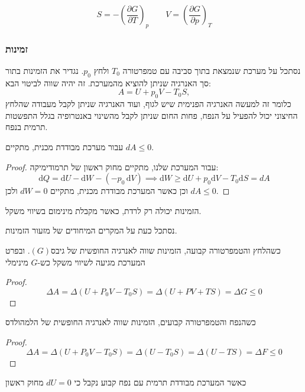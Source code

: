 \documentclass{tstextbook}
\begin{document}
\begin{corollary}
$$S=-\left(\frac{\partial G}{\partial T}\right)_{p}\qquad V=\left(\frac{\partial G}{\partial p}\right)_{T}$$

\end{corollary}
\subsubsection{זמינות}

\begin{definition}[זמינות]
נסתכל על מערכת שנמצאת בתוך סביבה עם טמפרטורה \(T_{0}\) ולחץ \(p_{0}\). נגדיר את הזמינות בתור סך האנרגיה שניתן להוציא מהמערכת. זה יהיה שווה לביטוי הבא:
$$
A=U+p_{0}V-T_{0}S,$$
כלומר זה למעשה האנרגיה הפנימית שיש לגוף, ועוד האנרגיה שניתן לקבל מעבודה שהלחץ החיצוני יכול להפעיל על הנפח, פחות החום שניתן לקבל מהשינוי באנטרופיה בגלל התפשטות תרמית בנפח.

\end{definition}
\begin{proposition}
עבור מערכת מבודדת מכנית, מתקיים \(dA\leq 0\). 

\end{proposition}
\begin{proof}
עבור המערכת שלנו, מתקיים מחוק ראשון של תרמודימיקה:
$${\mathrm{d}}Q=\mathrm{d}U-{\mathrm{d}}W-\left( -p_{0}\,\mathrm{d}V \right)\implies \mathrm{d}W\geq\mathrm{d}U+p_{0}\mathrm{d}V-T_{0}\mathrm{d}S=dA$$
וכן כאשר המערכת מבודדת מכנית, מתקיים \(dW=0\) ולכן \(dA\leq 0\).

\end{proof}
\begin{corollary}
הזמינות יכולה רק לרדת, כאשר מקבלת מינימום בשיווי משקל.

\end{corollary}
נסתכל כעת על המקרים המיחודים של מזעור הזמינות.

\begin{proposition}
כשהלחץ והטמפרטורה קבועה, הזמינות שווה לאנרגיה החופשית של גיבס\((G)\). ובפרט המערכת מגיעה לשיווי משקל כש-\(G\) מינימלי

\end{proposition}
\begin{proof}
$$\Delta\!A\!=\!\Delta(U\!+\!P_{0}V\!-\!T_{0}S)\!=\!\Delta(U\!+\!P V\!+\!T S)\!=\!\Delta G\!\leq\!0$$

\end{proof}
\begin{proposition}
כשהנפח והטמפרטורה קבועים, הזמינות שווה לאנרגיה החופשית של הלמהולדס

\end{proposition}
\begin{proof}
$$\Delta A=\Delta(U+P_{0}V-T_{0}S)=\Delta(U-T_{0}S)=\Delta(U-T S)=\Delta F\leq0$$

\end{proof}
\begin{corollary}
כאשר המערכת מבודדת תרמית עם נפח קבוע נקבל כי \(dU=0\) מחוק ראשון

\end{corollary}
\end{document}
